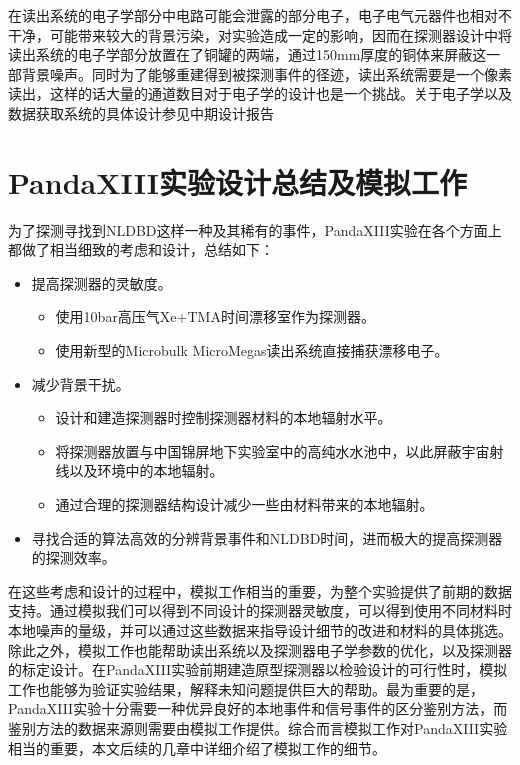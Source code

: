 在读出系统的电子学部分中电路可能会泄露的部分电子，电子电气元器件也相对不干净，可能带来较大的背景污染，对实验造成一定的影响，因而在探测器设计中将读出系统的电子学部分放置在了铜罐的两端，通过150mm厚度的铜体来屏蔽这一部背景噪声。同时为了能够重建得到被探测事件的径迹，读出系统需要是一个像素读出，这样的话大量的通道数目对于电子学的设计也是一个挑战。关于电子学以及数据获取系统的具体设计参见中期设计报告\supercite{cdr}

\section{PandaXIII实验设计总结及模拟工作}

为了探测寻找到NLDBD这样一种及其稀有的事件，PandaXIII实验在各个方面上都做了相当细致的考虑和设计，总结如下：
\begin{itemize}
    \item 提高探测器的灵敏度。
    \begin{itemize}
        \item 使用10bar高压气Xe+TMA时间漂移室作为探测器。
        \item 使用新型的Microbulk MicroMegas读出系统直接捕获漂移电子。
    \end{itemize}
    \item 减少背景干扰。
    \begin{itemize}
        \item 设计和建造探测器时控制探测器材料的本地辐射水平。
        \item 将探测器放置与中国锦屏地下实验室中的高纯水水池中，以此屏蔽宇宙射线以及环境中的本地辐射。
        \item 通过合理的探测器结构设计减少一些由材料带来的本地辐射。
    \end{itemize}
    \item 寻找合适的算法高效的分辨背景事件和NLDBD时间，进而极大的提高探测器的探测效率。
\end{itemize}
在这些考虑和设计的过程中，模拟工作相当的重要，为整个实验提供了前期的数据支持。通过模拟我们可以得到不同设计的探测器灵敏度，可以得到使用不同材料时本地噪声的量级，并可以通过这些数据来指导设计细节的改进和材料的具体挑选。除此之外，模拟工作也能帮助读出系统以及探测器电子学参数的优化，以及探测器的标定设计。在PandaXIII实验前期建造原型探测器以检验设计的可行性时，模拟工作也能够为验证实验结果，解释未知问题提供巨大的帮助。最为重要的是，PandaXIII实验十分需要一种优异良好的本地事件和信号事件的区分鉴别方法，而鉴别方法的数据来源则需要由模拟工作提供。综合而言模拟工作对PandaXIII实验相当的重要，本文后续的几章中详细介绍了模拟工作的细节。

